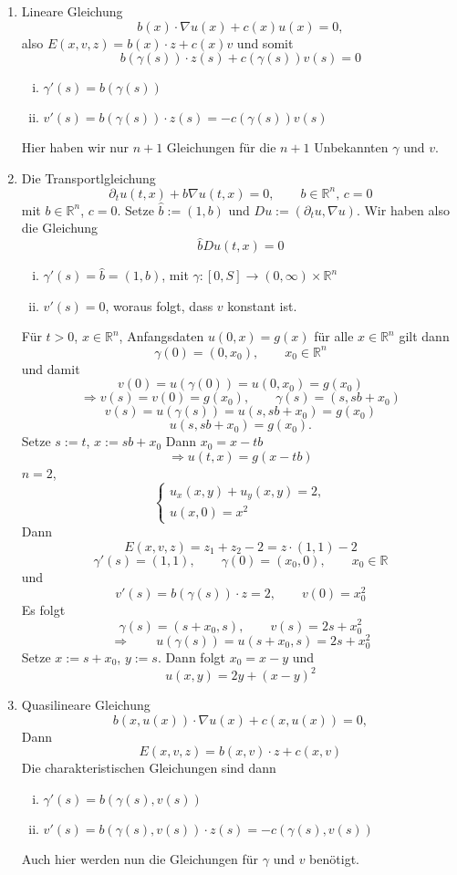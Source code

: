 \begin{beispiel}
	\begin{enumerate}[1.]
		\item Lineare Gleichung \[
			b(x) \cdot  \nabla u(x) + c(x) u(x) = 0,
		\]also $E(x,v,z) = b(x) \cdot z + c(x) v$ und somit
		\[
			b(\gamma(s)) \cdot z(s) + c (\gamma(s))v(s) = 0
		\]
		\begin{enumerate}[(i)]
			\item $\gamma'(s) = b(\gamma(s))$
			\item $v'(s) = b(\gamma(s)) \cdot z(s) = -c (\gamma(s))v(s)$
		\end{enumerate}
		Hier haben wir nur $n+1$ Gleichungen für die $n+1$ Unbekannten $\gamma$ und $v$.
		\item Die Transportlgleichung
		\[
			\partial_t u(t,x) + b  \nabla u(t,x) = 0, \qquad b \in \mathbb{R}^n,\, c=0
		\]
		mit $b \in \mathbb{R}^n$, $c=0$. Setze $\hat{b}:= (1,b)$ und $Du:= ( \partial_t u,  \nabla u)$. Wir haben also die Gleichung
		\[
			\hat{b} Du(t,x) = 0
		\]
		\begin{enumerate}[(i)]
			\item $\gamma'(s) = \hat{b} = (1,b)$, mit $\gamma : [0,S] \to (0,\infty) \times \mathbb{R}^n$
			\item $v'(s) = 0$, woraus folgt, dass $v$ konstant ist.
		\end{enumerate}
		Für $t>0$, $x \in \mathbb{R}^n$, Anfangsdaten $u(0,x) = g(x)$ für alle $x \in \mathbb{R}^n$ gilt dann
		\[
			\gamma(0) = (0,x_0), \qquad x_0 \in \mathbb{R}^n
		\]
		und damit
		\[
			v(0) = u(\gamma(0))= u(0,x_0) = g(x_0)
		\]
		\[
			\Rightarrow v(s) = v(0) = g(x_0), \qquad \gamma(s) = (s, sb + x_0)
		\]
		\[
			v(s) = u(\gamma(s)) = u(s, sb+x_0) = g(x_0)
		\]
		\[
			u(s,sb+ x_0) = g(x_0).
		\]
		Setze $s:=t$, $x:= sb+x_0$ Dann $x_0 = x - tb$
		\[
			\Rightarrow u(t,x)= g(x-tb)
		\]
		$n=2$,
		\[
			\begin{cases}
				u_x(x,y)+ u_y(x,y) =2,\\
				u(x,0)= x^2
			\end{cases}
		\]
		Dann
		\[
			E(x,v,z) = z_1+z_2 -2 = z \cdot (1,1) - 2
		\]
		\[
			\gamma'(s) = (1,1), \qquad \gamma(0) = (x_0,0), \qquad x_0 \in \mathbb{R}
		\]
		und 
		\[
			v'(s) = b(\gamma(s)) \cdot z = 2, \qquad v(0) = x_0^2
		\]
		Es folgt
		\[
			\gamma(s) = (s+x_0,s), \qquad v(s) = 2s + x_0^2
		\]
		\[
			\Rightarrow \qquad u(\gamma(s)) = u(s+x_0,s) = 2s+ x_0^2
		\]
		Setze $x:= s+ x_0$, $y:=s$. Dann folgt $x_0= x-y$ und
		\[
			u(x,y) = 2y+ (x-y)^2
		\]
		\item Quasilineare Gleichung 
		\[
			b(x,u(x)) \cdot  \nabla u(x) + c(x,u(x)) = 0,
		\]
		Dann \[
			E(x,v,z) = b(x,v) \cdot z + c(x,v)
		\]
		Die charakteristischen Gleichungen sind dann
		\begin{enumerate}[(i)]
			\item $\gamma'(s) = b(\gamma(s),v(s))$
			\item $v'(s) = b(\gamma(s),v(s)) \cdot z(s) = -c (\gamma(s),v(s))$
		\end{enumerate}
		Auch hier werden nun die Gleichungen für $\gamma$ und $v$ benötigt.
	\end{enumerate}
\end{beispiel}

